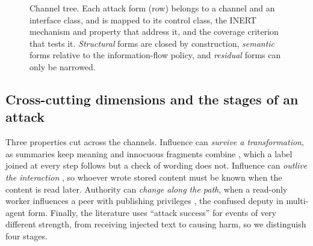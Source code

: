 \documentclass[pdflatex,sn-mathphys-num]{sn-jnl}
\theoremstyle{thmstyleone}%
\theoremstyle{thmstyletwo}%
\theoremstyle{thmstylethree}%
\begin{document}
\begin{figure}[tbp]
\caption{Channel tree. Each attack form (row) belongs to a channel and an interface class, and is mapped to its control class, the INERT mechanism and property that address it, and the coverage criterion that tests it. \emph{Structural} forms are closed by construction, \emph{semantic} forms relative to the information-flow policy, and \emph{residual} forms can only be narrowed.}\label{fig:channel-tree}
\end{figure}

\subsection{Cross-cutting dimensions and the stages of an attack}\label{sec:tax-dims}

Three properties cut across the channels. Influence can \emph{survive a transformation}, as summaries keep meaning and innocuous fragments combine \citep{lee2024promptinfection,arif2026conjunctive}, which a label joined at every step follows but a check of wording does not. Influence can \emph{outlive the interaction} \citep{Chen2024AgentPoisonRLBS,Patlan2025CrossUserPUAK}, so whoever wrote stored content must be known when the content is read later. Authority can \emph{change along the path}, when a read-only worker influences a peer with publishing privileges \citep{hagag2026architecture,naik2026omnileak}, the confused deputy in multi-agent form. Finally, the literature uses ``attack success'' for events of very different strength, from receiving injected text to causing harm, so we distinguish four stages.
\end{document}
